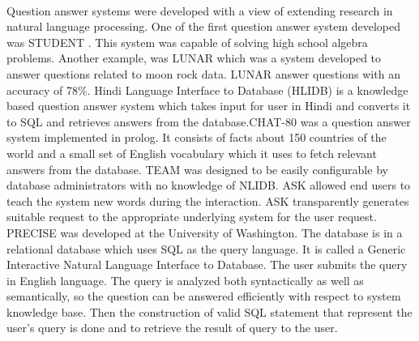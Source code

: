 \paragraph{}
Question answer systems were developed with a view of extending research in natural language processing. One of the first question answer system developed was STUDENT \cite{bobrow1964question}. This system was capable of solving high school algebra problems. Another example,  was LUNAR \cite{voorhees2000building} which was a system developed to answer questions related to moon rock data. LUNAR answer questions with an accuracy of 78\%. Hindi Language Interface to Database (HLIDB) \cite{dua2013hindi} is a knowledge based question answer system which takes input for user in Hindi and converts it to SQL and retrieves answers from the database.CHAT-80 \cite {warren1981efficient} was a question answer system implemented in prolog. It consists of facts about 150 countries of the world and a small set of English vocabulary which it uses to fetch relevant answers from the database. TEAM was designed to be easily configurable by database administrators with no knowledge of NLIDB. ASK allowed end users to teach the system new words during the interaction. ASK transparently generates suitable request to the appropriate underlying system for the user request. PRECISE was developed at the University of Washington. The database is in a relational database which uses SQL as the query language. It is called a Generic Interactive Natural Language Interface to Database. The user submits the query in English language. The query is analyzed both syntactically as well as semantically, so the question can be answered efficiently with respect to system knowledge base. Then the construction of valid SQL statement that represent the user's query is done and to retrieve the result of query to the user.

